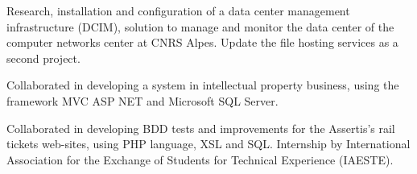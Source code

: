\documentclass[9pt,a4paper]{altacv}
\begin{document}

\begin{fullwidth}
\makecvheader
\end{fullwidth}



Research, installation and configuration of a data center management infrastructure (DCIM), solution to manage and monitor the data center of the computer networks center at CNRS Alpes. Update the file hosting services as a second project. 

\divider


Collaborated in developing a system in intellectual property business, using the framework MVC ASP NET and Microsoft SQL Server. 

\divider


Collaborated in developing BDD tests and improvements for the Assertis’s rail tickets web-sites, using PHP language, XSL and SQL. Internship by International Association for the Exchange of Students for Technical Experience (IAESTE).
\end{document}
